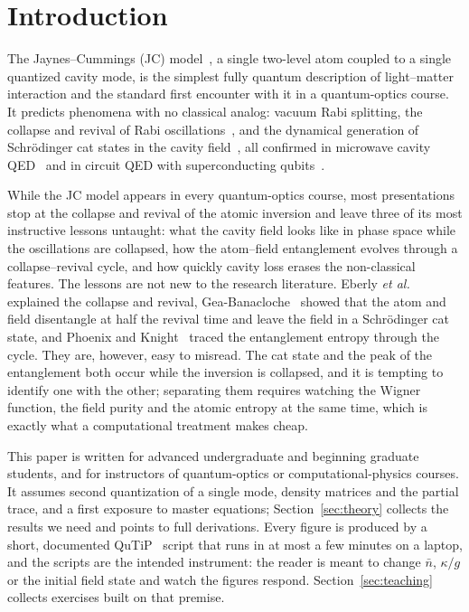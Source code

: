 \documentclass{iopjournal}
\begin{document}
\section{Introduction}
\label{sec:intro}

The Jaynes--Cummings (JC) model~\cite{jaynes1963}, a single two-level atom coupled to a single quantized cavity mode, is the simplest fully quantum description of light--matter interaction and the standard first encounter with it in a quantum-optics course. It predicts phenomena with no classical analog: vacuum Rabi splitting, the collapse and revival of Rabi oscillations~\cite{eberly1980}, and the dynamical generation of Schr\"{o}dinger cat states in the cavity field~\cite{brune1996}, all confirmed in microwave cavity QED~\cite{rempe1987, haroche2006} and in circuit QED with superconducting qubits~\cite{blais2021}.

While the JC model appears in every quantum-optics course, most presentations stop at the collapse and revival of the atomic inversion and leave three of its most instructive lessons untaught: what the cavity field looks like in phase space while the oscillations are collapsed, how the atom--field entanglement evolves through a collapse--revival cycle, and how quickly cavity loss erases the non-classical features. The lessons are not new to the research literature. Eberly \textit{et al.}~\cite{eberly1980} explained the collapse and revival, Gea-Banacloche~\cite{gea-banacloche1990, gea-banacloche1991} showed that the atom and field disentangle at half the revival time and leave the field in a Schr\"{o}dinger cat state, and Phoenix and Knight~\cite{phoenix1988, phoenix1991} traced the entanglement entropy through the cycle. They are, however, easy to misread. The cat state and the peak of the entanglement both occur while the inversion is collapsed, and it is tempting to identify one with the other; separating them requires watching the Wigner function, the field purity and the atomic entropy at the same time, which is exactly what a computational treatment makes cheap.

This paper is written for advanced undergraduate and beginning graduate students, and for instructors of quantum-optics or computational-physics courses. It assumes second quantization of a single mode, density matrices and the partial trace, and a first exposure to master equations; Section~\ref{sec:theory} collects the results we need and points to full derivations. Every figure is produced by a short, documented QuTiP~\cite{johansson2012, johansson2013} script that runs in at most a few minutes on a laptop, and the scripts are the intended instrument: the reader is meant to change $\bar{n}$, $\kappa/g$ or the initial field state and watch the figures respond. Section~\ref{sec:teaching} collects exercises built on that premise.
\end{document}
